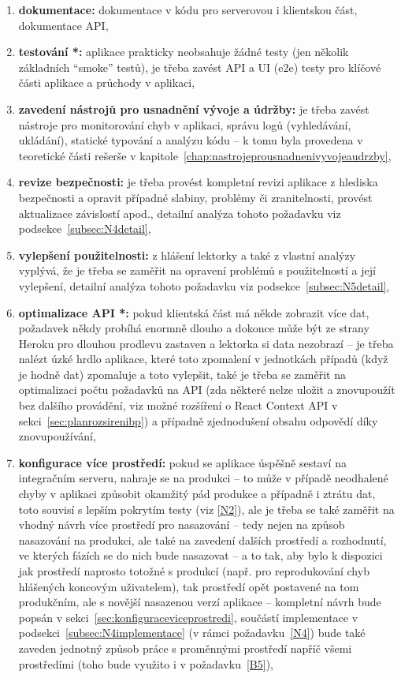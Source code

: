 \begin{enumerate}[label=\textbf{N\arabic*}]
    \item \label{N1} \textbf{dokumentace:} dokumentace v kódu pro serverovou i klientskou část, dokumentace API,
    \item \label{N2} \textbf{testování *:} aplikace prakticky neobsahuje žádné testy (jen několik základních \enquote{smoke} testů), je třeba zavést API a UI (e2e) testy pro klíčové části aplikace a průchody v aplikaci,
    \item \label{N3} \textbf{zavedení nástrojů pro usnadnění vývoje a údržby:} je třeba zavést nástroje pro monitorování chyb v aplikaci, správu logů (vyhledávání, ukládání), statické typování a analýzu kódu -- k tomu byla provedena v teoretické části rešerše v kapitole~\ref{chap:nastrojeprousnadnenivyvojeaudrzby},
    \item \label{N4} \textbf{revize bezpečnosti:} je třeba provést kompletní revizi aplikace z hlediska bezpečnosti a opravit případné slabiny, problémy či zranitelnosti, provést aktualizace závislostí apod., detailní analýza tohoto požadavku viz podsekce~\ref{subsec:N4detail},
    \item \label{N5} \textbf{vylepšení použitelnosti:} z hlášení lektorky a také z vlastní analýzy vyplývá, že je třeba se zaměřit na opravení problémů s použitelností a její vylepšení, detailní analýza tohoto požadavku viz podsekce~\ref{subsec:N5detail},
    \item \label{N6} \textbf{optimalizace API *:} pokud klientská část má někde zobrazit více dat, požadavek někdy probíhá enormně dlouho a dokonce může být ze strany Heroku pro dlouhou prodlevu zastaven a lektorka si data nezobrazí -- je třeba nalézt úzké hrdlo aplikace, které toto zpomalení v jednotkách případů (když je hodně dat) zpomaluje a toto vylepšit, také je třeba se zaměřit na optimalizaci počtu požadavků na API (zda některé nelze uložit a znovupoužít bez dalšího provádění, viz možné rozšíření o React Context API v sekci~\ref{sec:planrozsirenibp}) a případně zjednodušení obsahu odpovědí díky znovupoužívání,
    \item \label{N7} \textbf{konfigurace více prostředí:} pokud se aplikace úspěšně sestaví na integračním serveru, nahraje se na produkci \cite{bp} -- to může v případě neodhalené chyby v aplikaci způsobit okamžitý pád produkce a případně i ztrátu dat, toto souvisí s lepším pokrytím testy (viz \ref{N2}), ale je třeba se také zaměřit na vhodný návrh více prostředí pro nasazování -- tedy nejen na způsob nasazování na produkci, ale také na zavedení dalších prostředí a rozhodnutí, ve kterých fázích se do nich bude nasazovat -- a to tak, aby bylo k dispozici jak prostředí naprosto totožné s produkcí (např. pro reprodukování chyb hlášených koncovým uživatelem), tak prostředí opět postavené na tom produkčním, ale s novější nasazenou verzí aplikace -- kompletní návrh bude popsán v sekci~\ref{sec:konfiguraceviceprostredi}, součástí implementace v podsekci~\ref{subsec:N4implementace} (v rámci požadavku~\ref{N4}) bude také zaveden jednotný způsob práce s proměnnými prostředí napříč všemi prostředími (toho bude využito i v požadavku~\ref{B5}),

\end{enumerate}
